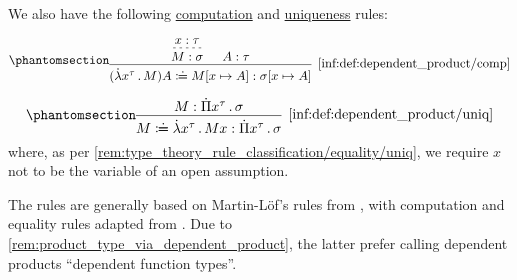 \begin{definition}
  We also have the following \hyperref[rem:type_theory_rule_classification/equality/comp]{computation} and \hyperref[rem:type_theory_rule_classification/equality/uniq]{uniqueness} rules:
  \begin{paracol}{2}
    \begin{leftcolumn}
      \ParacolAlignmentHack
      \begin{equation*}\taglabel[\ensuremath{ \Pi_\beta }]{inf:def:dependent_product/comp}
        \begin{prooftree}
          \hypo{ x: \tau }
          \infer[dashed]1{ M: \sigma }

          \hypo{ A: \tau }
          \infer2[\ref{inf:def:dependent_product/comp}]{ (\qabs {x^\tau} M) A \syndefeq M[x \mapsto A]: \sigma[x \mapsto A] }
        \end{prooftree}
      \end{equation*}
    \end{leftcolumn}

    \begin{rightcolumn}
      \ParacolAlignmentHack
      \begin{equation*}\taglabel[\ensuremath{ \Pi_\eta }]{inf:def:dependent_product/uniq}
        \begin{prooftree}
          \hypo{ M: \qprod {x^\tau} \sigma }
          \infer1[\ref{inf:def:dependent_product/uniq}]{ M \syndefeq \qabs {x^\tau} M x: \qprod {x^\tau} \sigma },
        \end{prooftree}
      \end{equation*}
      where, as per \cref{rem:type_theory_rule_classification/equality/uniq}, we require \( x \) not to be the variable of an open assumption.
    \end{rightcolumn}
  \end{paracol}
\end{definition}
\begin{comments}
  \item The rules are generally based on Martin-L\"of's rules from \cite[35]{MartinLöf1984IntuitionisticTypeTheory}, with computation and equality rules adapted from \cite[\S A.2.4]{UnivalentFoundationsProgram2024OctoberHoTT}. Due to \cref{rem:product_type_via_dependent_product}, the latter prefer calling dependent products \enquote{dependent function types}.
\end{comments}

